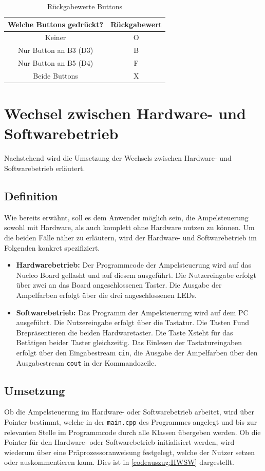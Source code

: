 \begin{table}[H]
	\centering
	\begin{tabular}[H]{c|c}
	Welche Buttons gedrückt? & Rückgabewert \\
	\hline
	Keiner & O \\
	Nur Button an B3 (D3) & B \\
	Nur Button an B5 (D4) & F \\
	Beide Buttons &  X \\
	\end{tabular}
	\caption{Rückgabewerte Buttons}
	\label{tab:Rueckgabe}
\end{table}

\chapter{Wechsel zwischen Hardware- und Softwarebetrieb}
Nachstehend wird die Umsetzung der Wechsels zwischen Hardware- und Softwarebetrieb erläutert.
\section{Definition}
Wie bereits erwähnt, soll es dem Anwender möglich sein, die Ampelsteuerung sowohl mit Hardware, als auch komplett ohne Hardware nutzen zu können. Um die beiden Fälle näher zu erläutern, wird der Hardware- und Softwarebetrieb im Folgenden konkret spezifiziert.

\begin{itemize}
	\item \textbf{Hardwarebetrieb:} Der Programmcode der Ampelsteuerung wird auf das Nucleo Board geflasht und auf diesem ausgeführt. Die Nutzereingabe erfolgt über zwei an das Board angeschlossenen Taster. Die Ausgabe der Ampelfarben erfolgt über die drei angeschlossenen LEDs.
	\item \textbf{Softwarebetrieb:} Das Programm der Ampelsteuerung wird auf dem PC ausgeführt. Die Nutzereingabe erfolgt über die Tastatur. Die Tasten \glqq F\grqq\:und \glqq B\grqq\:repräsentieren die beiden Hardwaretaster. Die Taste \glqq X\grqq\:steht für das Betätigen beider Taster gleichzeitig. Das Einlesen der Tastatureingaben erfolgt über den Eingabestream \texttt{cin}, die Ausgabe der Ampelfarben über den Ausgabestream \texttt{cout} in der Kommandozeile.
\end{itemize}

\section{Umsetzung}
Ob die Ampelsteuerung im Hardware- oder Softwarebetrieb arbeitet, wird über Pointer bestimmt, welche in der \:\texttt{main.cpp}\: des Programmes angelegt und bis zur relevanten Stelle im Programmcode durch alle Klassen übergeben werden. Ob die Pointer für den Hardware- oder Softwarebetrieb initialisiert werden, wird wiederum über eine Präprozessoranweisung festgelegt, welche der Nutzer setzen oder auskommentieren kann. Dies ist in \autoref{codeauszug:HWSW} dargestellt. \\

